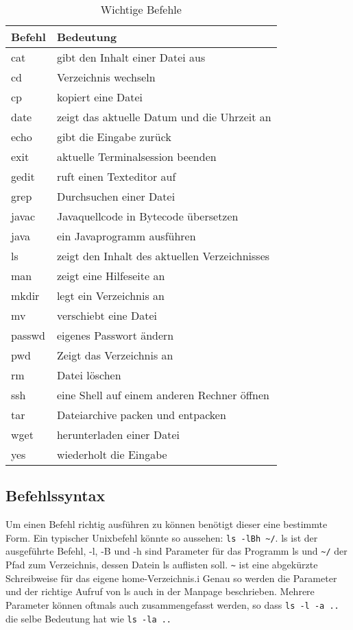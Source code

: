 \begin{table}
\centering
\begin{tabular}{l|l}
Befehl & Bedeutung \\ \hline
cat & gibt den Inhalt einer Datei aus \\
cd & Verzeichnis wechseln \\
cp & kopiert eine Datei \\
date & zeigt das aktuelle Datum und die Uhrzeit an \\
echo & gibt die Eingabe zurück \\
exit & aktuelle Terminalsession beenden \\
gedit & ruft einen Texteditor auf \\
grep & Durchsuchen einer Datei \\
javac & Javaquellcode in Bytecode übersetzen \\
java & ein Javaprogramm ausführen \\
ls & zeigt den Inhalt des aktuellen Verzeichnisses \\
man & zeigt eine Hilfeseite an \\
mkdir & legt ein Verzeichnis an \\
mv & verschiebt eine Datei \\
passwd & eigenes Passwort ändern \\
pwd & Zeigt das Verzeichnis an \\
rm & Datei löschen \\
ssh & eine Shell auf einem anderen Rechner öffnen \\
tar & Dateiarchive packen und entpacken \\
wget & herunterladen einer Datei \\
yes & wiederholt die Eingabe
\end{tabular}
\label{Befehle}
\caption{Wichtige Befehle}
\end{table}

\subsection{Befehlssyntax}
Um einen Befehl richtig ausführen zu können benötigt dieser eine bestimmte Form. Ein typischer Unixbefehl könnte so aussehen:
\lstinline$ls -lBh ~/$. ls ist der ausgeführte Befehl, -l, -B und -h sind Parameter für das Programm ls und \lstinline$~/$ der Pfad zum Verzeichnis, dessen Datein ls auflisten soll. \lstinline$~$ ist eine abgekürzte Schreibweise für das eigene home-Verzeichnis.i
Genau so werden die Parameter und der richtige Aufruf von ls auch in der Manpage beschrieben. Mehrere Parameter können oftmals auch zusammengefasst werden, so dass \lstinline$ls -l -a ..$ die selbe Bedeutung hat wie \lstinline$ls -la ..$


